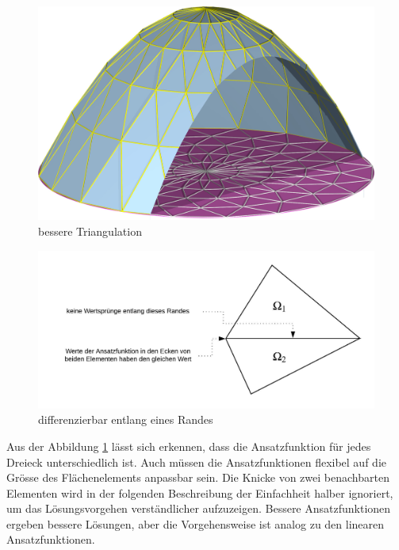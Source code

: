 \begin{figure}
	\centering
	\includegraphics[scale=0.8]{papers/fem/Images/polar.jpg}
	\caption{bessere Triangulation}
	\label{fig:besser Approx}
\end{figure}
\begin{figure}
	\centering
	\includegraphics[scale=0.8]{papers/fem/Images/Rand.jpeg}
	\caption{differenzierbar entlang eines Randes}
	\label{fig:Randbedingung}
\end{figure}
Aus der Abbildung \ref{fig:besser Approx} lässt sich erkennen, dass
die Ansatzfunktion für jedes Dreieck unterschiedlich ist.
Auch müssen die Ansatzfunktionen flexibel auf die Grösse des
Flächenelements anpassbar sein.
Die Knicke von zwei benachbarten Elementen wird in der folgenden
Beschreibung der Einfachheit halber ignoriert, um das Lösungsvorgehen
verständlicher aufzuzeigen.
Bessere Ansatzfunktionen ergeben bessere Lösungen, aber die
Vorgehensweise ist analog zu den linearen Ansatzfunktionen.
